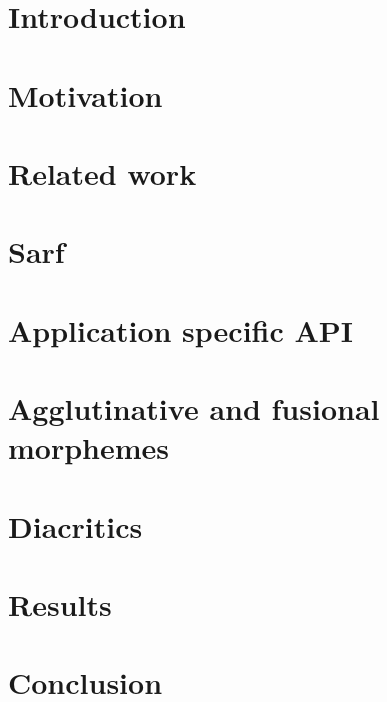 \documentclass{nle}
\begin{document}
\label{firstpage}
\maketitle

\begin{abstract}

\end{abstract}


\section{Introduction}
\label{sec:intro}


\section{Motivation}
\label{sec:motivation}


\section{Related work}
\label{sec:related}


\section{Sarf}
\label{sec:overview}



\section{Application specific API}
\label{sec:api}



\section{Agglutinative and fusional morphemes}
\label{sec:aggaffix}




\section{Diacritics}
\label{sec:diac}





\section{Results}
\label{sec:results}


\section{Conclusion}
\label{sec:conclusion}


{\footnotesize


}

\label{lastpage}
\end{document}
